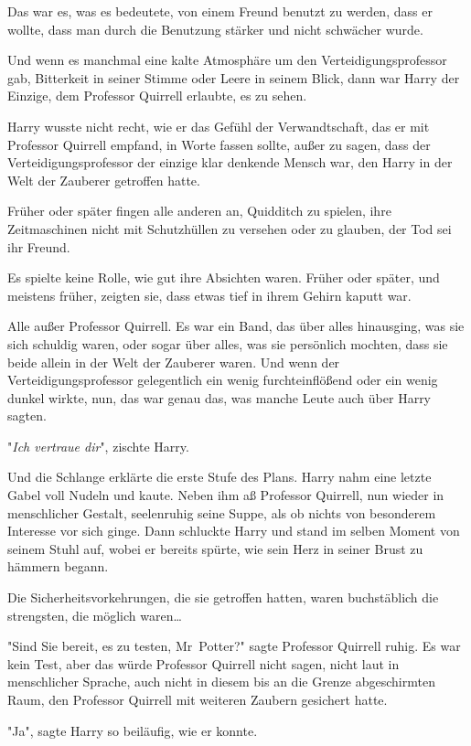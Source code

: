 {Das war es, was es bedeutete, von einem Freund benutzt zu werden, dass er wollte, dass man durch die Benutzung stärker und nicht schwächer wurde.

Und wenn es manchmal eine kalte Atmosphäre um den Verteidigungsprofessor gab, Bitterkeit in seiner Stimme oder Leere in seinem Blick, dann war Harry der Einzige, dem Professor Quirrell erlaubte, es zu sehen.

Harry wusste nicht recht, wie er das Gefühl der Verwandtschaft, das er mit Professor Quirrell empfand, in Worte fassen sollte, außer zu sagen, dass der Verteidigungsprofessor der einzige klar denkende Mensch war, den Harry in der Welt der Zauberer getroffen hatte.

Früher oder später fingen alle anderen an, Quidditch zu spielen, ihre Zeitmaschinen nicht mit Schutzhüllen zu versehen oder zu glauben, der Tod sei ihr Freund.

Es spielte keine Rolle, wie gut ihre Absichten waren. Früher oder später, und meistens früher, zeigten sie, dass etwas tief in ihrem Gehirn kaputt war.

Alle außer Professor Quirrell. Es war ein Band, das über alles hinausging, was sie sich schuldig waren, oder sogar über alles, was sie persönlich mochten, dass sie beide allein in der Welt der Zauberer waren. Und wenn der Verteidigungsprofessor gelegentlich ein wenig furchteinflößend oder ein wenig dunkel wirkte, nun, das war genau das, was manche Leute auch über Harry sagten.

"\emph{Ich vertraue dir}", zischte Harry.

Und die Schlange erklärte die erste Stufe des Plans. Harry nahm eine letzte Gabel voll Nudeln und kaute. Neben ihm aß Professor Quirrell, nun wieder in menschlicher Gestalt, seelenruhig seine Suppe, als ob nichts von besonderem Interesse vor sich ginge. Dann schluckte Harry und stand im selben Moment von seinem Stuhl auf, wobei er bereits spürte, wie sein Herz in seiner Brust zu hämmern begann.

Die Sicherheitsvorkehrungen, die sie getroffen hatten, waren buchstäblich die strengsten, die möglich waren…

"Sind Sie bereit, es zu testen, Mr~Potter?" sagte Professor Quirrell ruhig. Es war kein Test, aber das würde Professor Quirrell nicht sagen, nicht laut in menschlicher Sprache, auch nicht in diesem bis an die Grenze abgeschirmten Raum, den Professor Quirrell mit weiteren Zaubern gesichert hatte.

"Ja", sagte Harry so beiläufig, wie er konnte.

}
